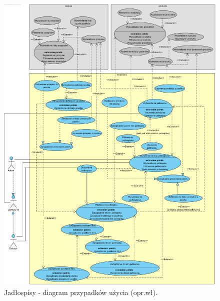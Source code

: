 \begin{minipage}{\textwidth}
    \begin{figure}[H]
        \centering\includegraphics[scale=0.55]{../uml/use_case_diagrams/mealplans.png}
        \caption{Jadłospisy - diagram przypadków użycia (opr.wł).}\label{rysunek:use-case-diagram-mealplans}
    \end{figure}
\end{minipage}

